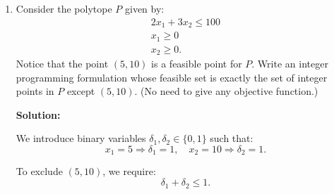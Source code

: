 \documentclass{article}
\begin{document}
\begin{enumerate}
\textbf{Turbine constraints:}

For each turbine $i = 1, 2, 3$, the steam consumption $y_i$ must be between the minimum and maximum values when the turbine is ON, and must be 0 when OFF:
\begin{align*}
100 v_1 &\leq y_1 \leq 700 v_1, \\
400 v_2 &\leq y_2 \leq 800 v_2, \\
300 v_3 &\leq y_3 \leq 600 v_3.
\end{align*}

The power produced by each turbine $i$ is proportional to the steam consumed:
\begin{align*}
z_1 &= 7 y_1, \\
z_2 &= 3 y_2, \\
z_3 &= 6 y_3.
\end{align*}

The processing cost for each turbine $i$ is:
\begin{align*}
p_1 &= 9 y_1, \\
p_2 &= 4 y_2, \\
p_3 &= 6 y_3.
\end{align*}

\textbf{Steam balance constraint:}

The total steam produced by all boilers must be at least the total steam consumed by all turbines:
\[
\sum_{i=1}^{4} x_i \geq \sum_{i=1}^{3} y_i.
\]

\textbf{Power production constraint:}

The total power produced must be at least 9,000 Kwh:
\[
\sum_{i=1}^{3} z_i \geq 9000.
\]

\item Consider the polytope $P$ given by:
\begin{eqnarray*}
2x_1 + 3x_2 \leq 100 \\
x_1 \geq 0 \\
x_2 \geq 0.
\end{eqnarray*}
Notice that the point $(5, 10)$ is a feasible point for $P$. Write an integer programming formulation whose feasible set is exactly the set of integer points in $P$ except $(5,10)$. (No need to give any objective function.)

\textbf{Solution:}

We introduce binary variables $\delta_1, \delta_2 \in \{0,1\}$ such that:
\[
x_1 = 5 \Rightarrow \delta_1 = 1, \quad x_2 = 10 \Rightarrow \delta_2 = 1.
\]

To exclude $(5, 10)$, we require:
\[
\delta_1 + \delta_2 \leq 1.
\]


\end{enumerate}
\end{document}
